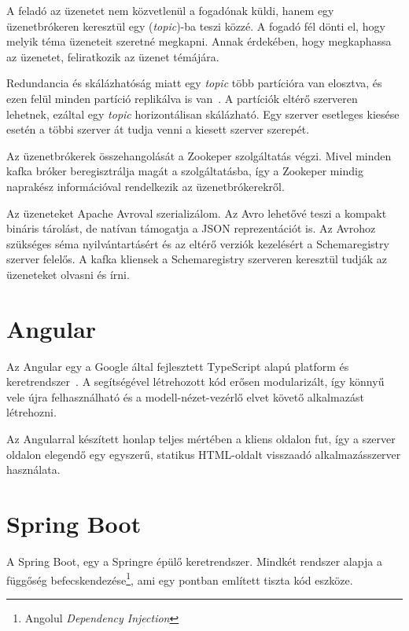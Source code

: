 A feladó az üzenetet nem közvetlenül a fogadónak küldi, hanem egy üzenetbrókeren keresztül egy (\textit{topic})-ba teszi közzé. A fogadó fél dönti el, hogy melyik téma üzeneteit szeretné megkapni. Annak érdekében, hogy megkaphassa az üzenetet, feliratkozik az üzenet témájára.

Redundancia és skálázhatóság miatt egy \textit{topic} több partícióra van elosztva, és ezen felül minden partíció replikálva is van~\cite{OReally_Kafka_Internals}. A partíciók eltérő szerveren lehetnek, ezáltal egy \textit{topic} horizontálisan skálázható. Egy szerver esetleges kiesése esetén a többi szerver át tudja venni a kiesett szerver szerepét.

Az üzenetbrókerek összehangolását a Zookeper szolgáltatás végzi. Mivel minden kafka bróker beregisztrálja magát a szolgáltatásba, így a Zookeper mindig naprakész információval rendelkezik az üzenetbrókerekről.

Az üzeneteket Apache Avroval szerializálom. Az Avro lehetővé teszi a kompakt bináris tárolást, de natívan támogatja a JSON reprezentációt is. Az Avrohoz szükséges séma nyilvántartásért és az eltérő verziók kezelésért a Schemaregistry szerver felelős. A kafka kliensek a Schemaregistry szerveren keresztül tudják az üzeneteket olvasni és írni. 



\section{Angular}\label{sec:angular}
Az \foreignlanguage{british}{Angular} egy a \foreignlanguage{british}{Google} által fejlesztett \foreignlanguage{british}{TypeScript} alapú platform és	keretrendszer~\cite{angular_docs}. A segítségével létrehozott kód erősen modularizált, így könnyű vele újra felhasználható és a modell-nézet-vezérlő elvet követő alkalmazást létrehozni.

Az Angularral készített honlap teljes mértében a kliens oldalon fut, így a szerver oldalon elegendő egy egyszerű, statikus HTML-oldalt visszaadó alkalmazásszerver használata.


\section{Spring Boot}\label{sec:spring_boot}
A \foreignlanguage{british}{Spring Boot}, egy a Springre épülő keretrendszer. Mindkét rendszer alapja a függőség befecskendezése\footnote{Angolul \foreignlanguage{british}{\textit{Dependency Injection}}}, ami egy  pontban említett tiszta kód \cite{clean_code_chapter_systems} eszköze.

